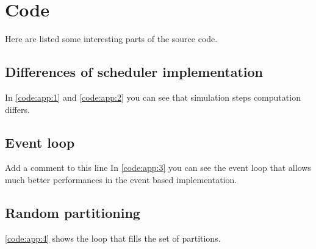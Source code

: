 \newpage\cleardoublepage{}
\section{Code}

Here are listed some interesting parts of the source code.


\subsection{Differences of scheduler implementation}

In \ref{code:app:1} and \ref{code:app:2} you can see that simulation steps computation differs.



\subsection{Event loop}

Add a comment to this line
In \ref{code:app:3} you can see the event loop that allows much better performances in the event based implementation.


\subsection{Random partitioning}

\ref{code:app:4} shows the loop that fills the set of partitions.


